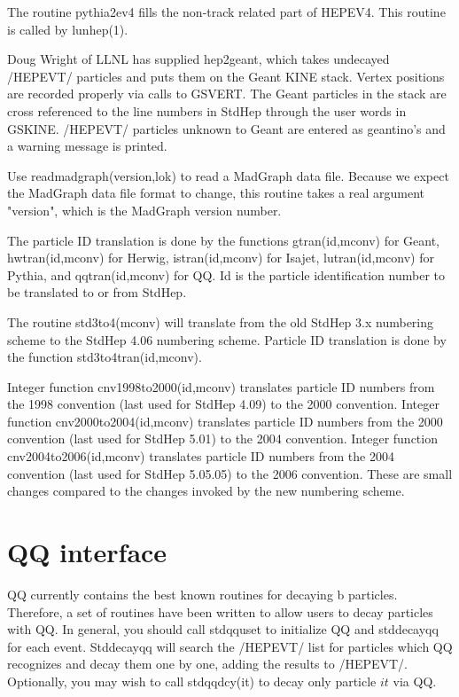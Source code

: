 The routine pythia2ev4 fills the non-track related part of HEPEV4.
This routine is called by lunhep(1).

Doug Wright of LLNL has supplied hep2geant, which takes undecayed /HEPEVT/
particles and puts them on the Geant KINE stack.  
Vertex positions are recorded properly via calls to GSVERT.
The Geant particles in the stack are cross referenced to the 
line numbers in StdHep through the user words in GSKINE.
/HEPEVT/ particles unknown to Geant are entered as geantino's and
a warning message is printed.  

Use readmadgraph(version,lok) to read a MadGraph data file.
Because we expect the MadGraph data file format to change, this routine 
takes a real argument "version", which is the MadGraph version number.

The particle ID translation is done by the functions gtran(id,mconv) for Geant, 
\linebreak
hwtran(id,mconv) for Herwig, istran(id,mconv) for Isajet, lutran(id,mconv)
for Pythia, and qqtran(id,mconv) for QQ.  Id is the particle identification
number to be translated to or from StdHep. 

The routine std3to4(mconv) will translate from the old StdHep 3.x
numbering scheme to the StdHep 4.06 numbering scheme.  Particle ID
translation is done by the function std3to4tran(id,mconv).

Integer function cnv1998to2000(id,mconv) translates particle ID numbers from
the 1998 convention (last used for StdHep 4.09) to the 2000 convention\cite{pdg2000}.
Integer function cnv2000to2004(id,mconv) translates particle ID numbers from
the 2000 convention (last used for StdHep 5.01) to the 2004 convention\cite{pdg2004}.
Integer function cnv2004to2006(id,mconv) translates particle ID numbers from
the 2004 convention (last used for StdHep 5.05.05) to the 2006 convention\cite{pdg2006}.
These are small changes compared to the changes invoked by the new 
numbering scheme.

\section{QQ interface}

QQ currently contains the best known routines for decaying b particles.
Therefore, a set of routines have been written to allow users to decay 
particles with QQ.  In general, you should call stdqquset to initialize 
QQ and stddecayqq for each event.  Stddecayqq will search the /HEPEVT/
list for particles which QQ recognizes and decay them one by one, adding
the results to /HEPEVT/.  Optionally, you may wish to call stdqqdcy(it)
to decay only particle $it$ via QQ.

